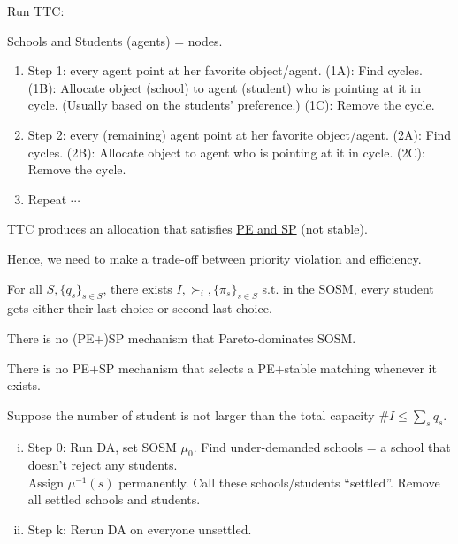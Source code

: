 \documentclass[11pt]{elegantbook}
\begin{document}
Run TTC:
\begin{definition}
    \normalfont
    Schools and Students (agents) = nodes.
    \begin{enumerate}
        \item Step 1: every agent point at her favorite object/agent.
        \subitem (1A): Find cycles.
        \subitem (1B): Allocate object (school) to agent (student) who is pointing at it in cycle. (Usually based on the students' preference.)
        \subitem (1C): Remove the cycle.
        \item Step 2: every (remaining) agent point at her favorite object/agent.
        \subitem (2A): Find cycles.
        \subitem (2B): Allocate object to agent who is pointing at it in cycle.
        \subitem (2C): Remove the cycle.
        \item Repeat $\cdots$
    \end{enumerate}
\end{definition}

\begin{proposition}
    TTC produces an allocation that satisfies \underline{PE and SP} (not stable).
\end{proposition}
Hence, we need to make a trade-off between priority violation and efficiency.

\begin{theorem}[Keslen]
    For all $S, \{q_s\}_{s\in S}$, there exists $I,\succ_i,\{\pi_s\}_{s\in S}$ s.t. in the SOSM, every student gets either their last choice or second-last choice.
\end{theorem}


\begin{theorem}
    There is no (PE+)SP mechanism that Pareto-dominates SOSM.
\end{theorem}

\begin{theorem}
    There is no PE+SP mechanism that selects a PE+stable matching whenever it exists.
\end{theorem}

\begin{definition}
    \normalfont
    Suppose the number of student is not larger than the total capacity $\# I\leq \sum_s q_s$.
    \begin{enumerate}[(i).]
        \item Step 0: Run DA, set SOSM $\mu_0$. Find under-demanded schools = a school that doesn't reject any students.\\
        Assign $\mu^{-1}(s)$ permanently. Call these schools/students ``settled''. Remove all settled schools and students.
        \item Step k: Rerun DA on everyone unsettled.
    \end{enumerate}
\end{definition}
\end{document}

